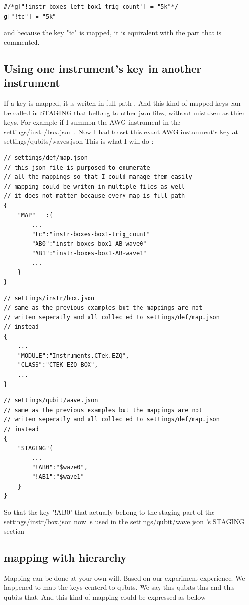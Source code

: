 \documentclass{article}
\begin{document}
\begin{lstlisting}
#/*g["!instr-boxes-left-box1-trig_count"] = "5k"*/
g["!tc"] = "5k"
\end{lstlisting}
and because the key "tc" is mapped, 
	it is equivalent with the part that is commented.

\subsection{Using one instrument's key in another instrument}
If a key is mapped, it is writen in full path .
And this kind of mapped keys can be called in STAGING that bellong to
other json files, without mistaken as thier keys.
For example if I summon the AWG instrument in the settings/instr/box.json .
Now I had to set this exact AWG insturment's key at settings/qubits/waves.json 
This is what I will do : 

\begin{lstlisting}
// settings/def/map.json
// this json file is purposed to enumerate 
// all the mappings so that I could manage them easily 
// mapping could be writen in multiple files as well
// it does not matter because every map is full path
{ 
	"MAP"	:{
		...	
		"tc":"instr-boxes-box1-trig_count"
		"AB0":"instr-boxes-box1-AB-wave0"
		"AB1":"instr-boxes-box1-AB-wave1"
		...	
	}
}
\end{lstlisting}



\begin{lstlisting}
// settings/instr/box.json
// same as the previous examples but the mappings are not
// writen seperatly and all collected to settings/def/map.json
// instead
{ 
	...	
	"MODULE":"Instruments.CTek.EZQ",
	"CLASS":"CTEK_EZQ_BOX", 
	...	
}
\end{lstlisting}



\begin{lstlisting}
// settings/qubit/wave.json
// same as the previous examples but the mappings are not
// writen seperatly and all collected to settings/def/map.json
// instead
{ 
	"STAGING"{
		...	
		"!AB0":"$wave0",
		"!AB1":"$wave1"
	}
}
\end{lstlisting}

So that the key "!AB0" that actually bellong to the staging
part of the settings/instr/box.json now is used in the 
settings/qubit/wave.json 's STAGING section


\subsection{mapping with hierarchy}
Mapping can be done at your own will.
Based on our experiment experience. We happened to map 
the keys centerd to qubits.
We say this qubits this and this qubits that.
And this kind of mapping could be expressed as bellow
\end{document}
